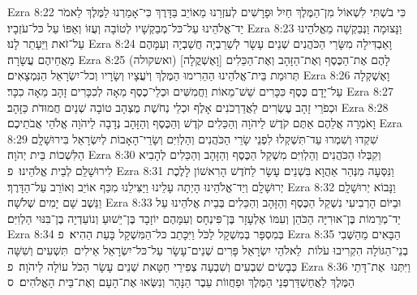 Ezra 8:22	כִּי בֹשְׁתִּי לִשְׁאוֹל מִן־הַמֶּלֶךְ חַיִל וּפָרָשִׁים לְעזְרֵנוּ מֵאוֹיֵב בַּדָּרֶךְ כִּי־אָמַרְנוּ לַמֶּלֶךְ לֵאמֹר יַד־אֱלֹהֵינוּ עַל־כּל־מְבַקְשָׁיו לְטוֹבָה וְעֻזּוֹ וְאַפּוֹ עַל כּל־עֹזְבָיו׃
Ezra 8:23	וַנָּצוּמָה וַנְּבַקְשָׁה מֵאֱלֹהֵינוּ עַל־זֹאת וַיֵּעָתֵר לָנוּ׃
Ezra 8:24	וָאַבְדִּילָה מִשָּׂרֵי הַכֹּהֲנִים שְׁנֵים עָשָׂר לְשֵׁרֵבְיָה חֲשַׁבְיָה וְעִמָּהֶם מֵאֲחֵיהֶם עֲשָׂרָה׃
Ezra 8:25	(ואשקולה) [וָאֶשְׁקֳלָה] לָהֶם אֶת־הַכֶּסֶף וְאֶת־הַזָּהָב וְאֶת־הַכֵּלִים תְּרוּמַת בֵּית־אֱלֹהֵינוּ הַהֵרִימוּ הַמֶּלֶךְ וְיֹעֲצָיו וְשָׂרָיו וְכל־יִשְׂרָאֵל הַנִּמְצָאִים׃
Ezra 8:26	וָאֶשְׁקְלָה עַל־יָדָם כֶּסֶף כִּכָּרִים שֵׁשׁ־מֵאוֹת וַחֲמִשִּׁים וּכְלֵי־כֶסֶף מֵאָה לְכִכָּרִים זָהָב מֵאָה כִכָּר׃
Ezra 8:27	וּכְפֹרֵי זָהָב עֶשְׂרִים לַאֲדַרְכֹנִים אָלֶף וּכְלֵי נְחֹשֶׁת מֻצְהָב טוֹבָה שְׁנַיִם חֲמוּדֹת כַּזָּהָב׃
Ezra 8:28	וָאֹמְרָה אֲלֵהֶם אַתֶּם קֹדֶשׁ לַיהֹוָה וְהַכֵּלִים קֹדֶשׁ וְהַכֶּסֶף וְהַזָּהָב נְדָבָה לַיהֹוָה אֱלֹהֵי אֲבֹתֵיכֶם׃
Ezra 8:29	שִׁקְדוּ וְשִׁמְרוּ עַד־תִּשְׁקְלוּ לִפְנֵי שָׂרֵי הַכֹּהֲנִים וְהַלְוִיִּם וְשָׂרֵי־הָאָבוֹת לְיִשְׂרָאֵל בִּירוּשָׁלָ͏ִם הַלִּשְׁכוֹת בֵּית יְהֹוָה׃
Ezra 8:30	וְקִבְּלוּ הַכֹּהֲנִים וְהַלְוִיִּם מִשְׁקַל הַכֶּסֶף וְהַזָּהָב וְהַכֵּלִים לְהָבִיא לִירוּשָׁלַ͏ִם לְבֵית אֱלֹהֵינוּ׃ {פ}
Ezra 8:31	וַנִּסְּעָה מִנְּהַר אַהֲוָא בִּשְׁנֵים עָשָׂר לַחֹדֶשׁ הָרִאשׁוֹן לָלֶכֶת יְרוּשָׁלָ͏ִם וְיַד־אֱלֹהֵינוּ הָיְתָה עָלֵינוּ וַיַּצִּילֵנוּ מִכַּף אוֹיֵב וְאוֹרֵב עַל־הַדָּרֶךְ׃
Ezra 8:32	וַנָּבוֹא יְרוּשָׁלָ͏ִם וַנֵּשֶׁב שָׁם יָמִים שְׁלֹשָׁה׃
Ezra 8:33	וּבַיּוֹם הָרְבִיעִי נִשְׁקַל הַכֶּסֶף וְהַזָּהָב וְהַכֵּלִים בְּבֵית אֱלֹהֵינוּ עַל יַד־מְרֵמוֹת בֶּן־אוּרִיָּה הַכֹּהֵן וְעִמּוֹ אֶלְעָזָר בֶּן־פִּינְחָס וְעִמָּהֶם יוֹזָבָד בֶּן־יֵשׁוּעַ וְנוֹעַדְיָה בֶן־בִּנּוּי הַלְוִיִּם׃
Ezra 8:34	בְּמִסְפָּר בְּמִשְׁקָל לַכֹּל וַיִּכָּתֵב כּל־הַמִּשְׁקָל בָּעֵת הַהִיא׃ {פ}
Ezra 8:35	הַבָּאִים מֵהַשְּׁבִי בְנֵי־הַגּוֹלָה הִקְרִיבוּ עֹלוֹת  לֵאלֹהֵי יִשְׂרָאֵל פָּרִים שְׁנֵים־עָשָׂר עַל־כּל־יִשְׂרָאֵל אֵילִים  תִּשְׁעִים וְשִׁשָּׁה כְּבָשִׂים שִׁבְעִים וְשִׁבְעָה צְפִירֵי חַטָּאת שְׁנֵים עָשָׂר הַכֹּל עוֹלָה לַיהֹוָה׃ {פ}
Ezra 8:36	וַיִּתְּנוּ  אֶת־דָּתֵי הַמֶּלֶךְ לַאֲחַשְׁדַּרְפְּנֵי הַמֶּלֶךְ וּפַחֲווֹת עֵבֶר הַנָּהָר וְנִשְּׂאוּ אֶת־הָעָם וְאֶת־בֵּית הָאֱלֹהִים׃ {ס}        
